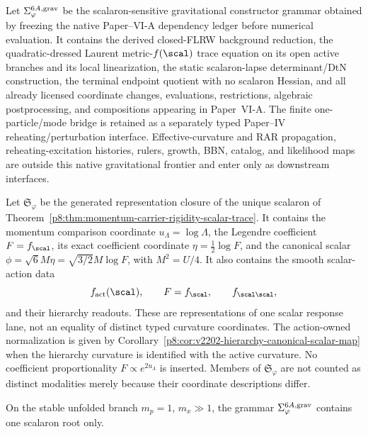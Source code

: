 \documentclass[12pt,a4paper]{article}
\begin{document}
\begin{definition}
\label{p8:def:frozen-scalaron-response-grammar}
Let $\Sigma^{6A,\rm grav}_{\varphi}$ be the scalaron-sensitive gravitational
constructor grammar obtained by freezing the native Paper--VI-A dependency
ledger before numerical evaluation.  It contains the derived closed-FLRW
background reduction, the quadratic-dressed Laurent metric-\(f(\scal)\) trace
equation on its open active branches and its local linearization, the static
scalaron-lapse determinant/DtN construction, the terminal endpoint quotient
with no scalaron Hessian, and all already licensed
coordinate changes, evaluations, restrictions, algebraic postprocessing, and
compositions appearing in Paper~VI-A.  The finite one-particle/mode bridge is
retained as a separately typed Paper--IV reheating/perturbation interface.
Effective-curvature and RAR propagation, reheating-excitation histories,
rulers, growth, BBN, catalog, and likelihood maps are outside this native
gravitational frontier and enter only as downstream interfaces.
\end{definition}

\begin{definition}
\label{p8:def:internal-scalaron-representation-closure}
Let $\mathfrak S_{\varphi}$ be the generated representation closure of the
unique scalaron of
Theorem~\ref{p8:thm:momentum-carrier-rigidity-scalar-trace}. It contains the
momentum comparison coordinate $u_{\Lambda}=\log\Lambda$, the Legendre
coefficient $F=f_{\scal}$, its exact coefficient coordinate
$\eta=\tfrac12\log F$, and the canonical scalar
$\phi=\sqrt6M\eta=\sqrt{3/2}M\log F$, with $M^2=U/4$.
It also contains the smooth scalar-action data
\[
 f_{\rm act}(\scal),\qquad F=f_{\scal},\qquad f_{\scal\scal},
\]
and their hierarchy readouts. These are representations of one scalar
response lane, not an equality of distinct typed curvature coordinates.
The action-owned normalization is given by
Corollary~\ref{p8:cor:v2202-hierarchy-canonical-scalar-map} when the
hierarchy curvature is identified with the active curvature. No
coefficient proportionality $F\propto e^{2u_{\Lambda}}$ is inserted.
Members of $\mathfrak S_{\varphi}$ are not counted as distinct modalities
merely because their coordinate descriptions differ.
\end{definition}

\begin{lemma}
\label{p8:lem:scalaron-completeness-one-root}
On the stable unfolded branch $m_p=1$, $m_x\gg1$, the grammar
$\Sigma^{6A,\rm grav}_{\varphi}$ contains one scalaron root only.
\end{lemma}
\end{document}
